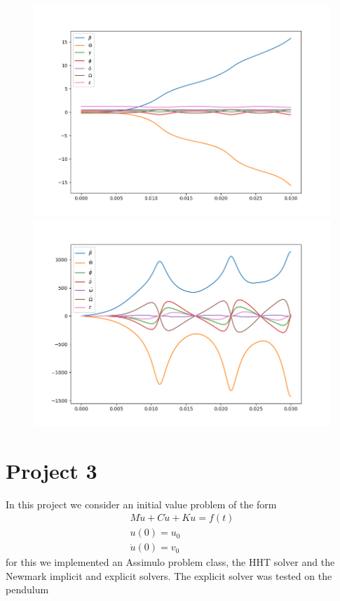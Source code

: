 \documentclass{report}
\begin{document}
\begin{figure}[h]
\begin{minipage}[t]{0.4\textwidth}
\centering
\includegraphics[width=\textwidth]{../Plots/RK4_Proj2/angles.png}
\end{minipage}
\begin{minipage}[t]{0.4\textwidth}
\centering
\includegraphics[width=\textwidth]{../Plots/RK4_Proj2/derivatives.png}
\end{minipage}
\end{figure}

\chapter*{Project 3}

In this project we consider an initial value problem of the form
\begin{align*}
	M \ddot{u}+C\dot{u}+Ku = f(t) \\
	u(0) = u_0 \\
	\dot{u}(0) = v_0
\end{align*}
for this we implemented an Assimulo problem class, the HHT solver and the Newmark implicit and explicit solvers. The explicit solver was tested on the pendulum 
\end{document}

